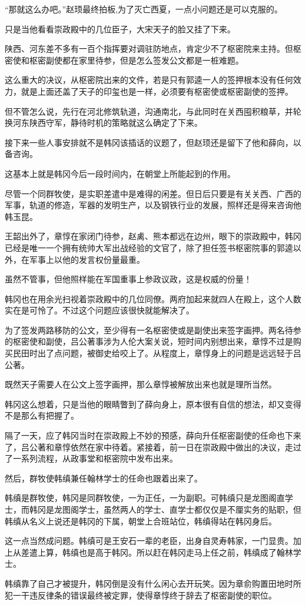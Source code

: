 “那就这么办吧。”赵顼最终拍板,为了灭亡西夏，一点小问题还是可以克服的。

只是当他看看崇政殿中的几位臣子，大宋天子的脸又挂了下来。

陕西、河东差不多有一百个指挥要对调驻防地点，肯定少不了枢密院来主持。但枢密使和枢密副使都在家里待参，但是怎么签发公文都是一桩难题。

这么重大的决议，从枢密院出来的文件，若是只有郭逵一人的签押根本没有任何效力，就是上面还盖了天子的印玺也是一样，必须要有枢密使或枢密副使的签押。

但不管怎么说，先行在河北修筑轨道，沟通南北，与此同时在关西囤积粮草，并轮换河东陕西守军，静待时机的策略就这么确定了下来。

接下来一些人事安排就不是韩冈该插话的议题了，但赵顼还是留下了他和薛向，以备咨询。

这基本上就是韩冈今后一段时间内，在朝堂上所能起到的作用。

尽管一个同群牧使，是实职差遣中是难得的闲差。但日后只要是有关关西、广西的军事，轨道的修造，军器的发明生产，以及钢铁行业的发展，照样还是得来咨询他韩玉昆。

王韶出外了，章惇在家闭门待参，赵禼、熊本都远在边州，眼下的崇政殿中，韩冈已经是唯一一个拥有统帅大军出战经验的文官了，除了担任签书枢密院事的郭逵以外，在军事上以他的发言权份量最重。

虽然不管事，但他照样能在军国重事上参政议政，这是权威的份量！

韩冈也在用余光扫视着崇政殿中的几位同僚。两府加起来就四人在殿上，这个人数实在是可怜了。不过这个问题应该很快就能解决了。

为了签发两路移防的公文，至少得有一名枢密使或是副使出来签字画押。两名待参的枢密使和副使，吕公著事涉为人伦大案关说，短时间内别想出来，章惇不过是购买民田时出了点问题，被御史给咬上了。从程度上，章惇身上的问题是远远轻于吕公著。

既然天子需要人在公文上签字画押，那么章惇被解放出来也就是理所当然。

韩冈这么想着，只是当他的眼睛瞥到了薛向身上，原本很有自信的想法，却又变得不是那么有把握了。

隔了一天，应了韩冈当时在崇政殿上不妙的预感，薛向升任枢密副使的任命也下来了，吕公著和章惇依然在家中待着。紧接着，前一日在崇政殿中做出的决议，走过了一系列流程，从政事堂和枢密院中发布出来。

然后，群牧使韩缜兼任翰林学士的任命也跟着出来了。

韩缜是群牧使，韩冈是同群牧使，一为正任，一为副职。可韩缜只是龙图阁直学士，而韩冈是龙图阁学士，虽然两人的学士、直学士都仅仅是不厘实务的贴职，但韩缜从名义上说还是韩冈的下属，朝堂上合班站位，韩缜得站在韩冈身后。

这一点当然成问题。韩缜可是王安石一辈的老臣，出身自灵寿韩家，一门显贵。加上从差遣上算，韩缜也是高于韩冈。所以赶在韩冈走马上任之前，韩缜成了翰林学士。

韩缜靠了自己才被提升，韩冈倒是没有什么闲心去开玩笑。因为章俞购置田地时所犯一干违反律条的错误最终被定罪，使得章惇终于辞去了枢密副使的职位。

